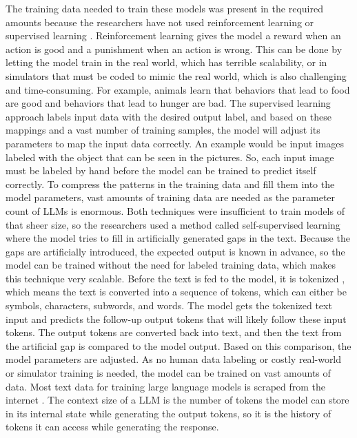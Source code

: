 \documentclass[draft,final]{thesisclass} %
\begin{document}
The training data needed to train these models was present in the required amounts because the researchers have not used reinforcement learning \parencite{rl_bible} or supervised learning \parencite[3]{sl_bible}.
Reinforcement learning gives the model a reward when an action is good and a punishment when an action is wrong. This can be done by letting the model train in the real world, which has terrible scalability, or in simulators that must be coded to mimic the real world, which is also challenging and time-consuming.
For example, animals learn that behaviors that lead to food are good and behaviors that lead to hunger are bad.
The supervised learning approach labels input data with the desired output label, and based on these mappings and a vast number of training samples, the model will adjust its parameters to map the input data correctly.
An example would be input images labeled with the object that can be seen in the pictures. So, each input image must be labeled by hand before the model can be trained to predict itself correctly.
To compress the patterns in the training data and fill them into the model parameters, vast amounts of training data are needed as the parameter count of \acs{LLM}s is enormous.
Both techniques were insufficient to train models of that sheer size, so the researchers used a method called self-supervised learning \parencite[7]{llm_literature_review} where the model tries to fill in artificially generated gaps in the text.
Because the gaps are artificially introduced, the expected output is known in advance, so the model can be trained without the need for labeled training data, which makes this technique very scalable.
Before the text is fed to the model, it is tokenized \parencite[4]{llm_literature_review}, which means the text is converted into a sequence of tokens, which can either be symbols, characters, subwords, and words.
The model gets the tokenized text input and predicts the follow-up output tokens that will likely follow these input tokens. The output tokens are converted back into text, and then the text from the artificial gap is compared to the model output.
Based on this comparison, the model parameters are adjusted. As no human data labeling or costly real-world or simulator training is needed, the model can be trained on vast amounts of data.
Most text data for training large language models is scraped from the internet \parencite[1]{llm_literature_review}.
The context size of a \acs{LLM} is the number of tokens the model can store in its internal state while generating the output tokens, so it is the history of tokens it can access while generating the response.
\end{document}
